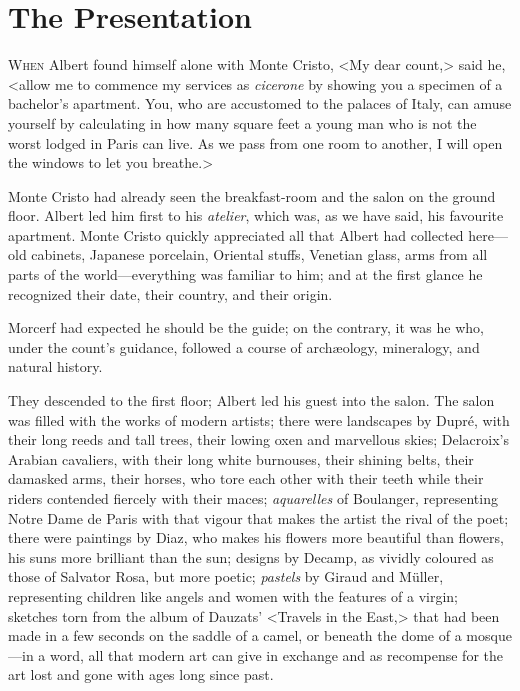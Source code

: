 \chapter{The Presentation} 

 \lettrine{W}{hen} Albert found himself alone with Monte Cristo, <My dear count,> said he, <allow me to commence my services as \textit{cicerone} by showing you a specimen of a bachelor's apartment. You, who are accustomed to the palaces of Italy, can amuse yourself by calculating in how many square feet a young man who is not the worst lodged in Paris can live. As we pass from one room to another, I will open the windows to let you breathe.> 

 Monte Cristo had already seen the breakfast-room and the salon on the ground floor. Albert led him first to his \textit{atelier}, which was, as we have said, his favourite apartment. Monte Cristo quickly appreciated all that Albert had collected here—old cabinets, Japanese porcelain, Oriental stuffs, Venetian glass, arms from all parts of the world—everything was familiar to him; and at the first glance he recognized their date, their country, and their origin. 

 Morcerf had expected he should be the guide; on the contrary, it was he who, under the count's guidance, followed a course of archæology, mineralogy, and natural history. 

 They descended to the first floor; Albert led his guest into the salon. The salon was filled with the works of modern artists; there were landscapes by Dupré, with their long reeds and tall trees, their lowing oxen and marvellous skies; Delacroix's Arabian cavaliers, with their long white burnouses, their shining belts, their damasked arms, their horses, who tore each other with their teeth while their riders contended fiercely with their maces; \textit{aquarelles} of Boulanger, representing Notre Dame de Paris with that vigour that makes the artist the rival of the poet; there were paintings by Diaz, who makes his flowers more beautiful than flowers, his suns more brilliant than the sun; designs by Decamp, as vividly coloured as those of Salvator Rosa, but more poetic; \textit{pastels} by Giraud and Müller, representing children like angels and women with the features of a virgin; sketches torn from the album of Dauzats' <Travels in the East,> that had been made in a few seconds on the saddle of a camel, or beneath the dome of a mosque—in a word, all that modern art can give in exchange and as recompense for the art lost and gone with ages long since past. 

